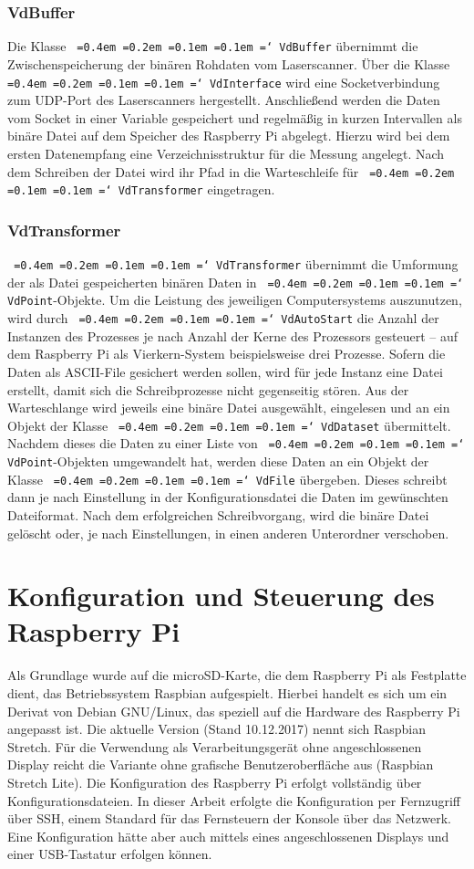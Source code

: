 \documentclass[a4paper,12pt,bibliography=totoc, listof=totoc,titlepage,pointlessnumbers]{scrreprt}
\newcommand*\justify{%
  \fontdimen2\font=0.4em%
  \fontdimen3\font=0.2em%
  \fontdimen4\font=0.1em%
  \fontdimen7\font=0.1em%
  \hyphenchar\font=`\-%
}
\newcommand{\code}[1]{\texttt{\justify{#1}}}
\begin{document}
\subsection{VdBuffer}
Die Klasse \code{VdBuffer} übernimmt die Zwischenspeicherung der binären Rohdaten vom Laser\-scan\-ner. Über die Klasse \code{VdInterface} wird eine Socketverbindung zum UDP-Port des Laser\-scan\-ners hergestellt. Anschließend werden die Daten vom Socket in einer Variable gespeichert und regelmäßig in kurzen Intervallen als binäre Datei auf dem Speicher des Rasp\-berry Pi abgelegt. Hierzu wird bei dem ersten Datenempfang eine Verzeichnisstruktur für die Messung angelegt. Nach dem Schreiben der Datei wird ihr Pfad in die Warteschleife für \code{VdTransformer} eingetragen.

\subsection{VdTransformer}
\code{VdTransformer} übernimmt die Umformung der als Datei gespeicherten binären Daten in \code{VdPoint}-Objekte. Um die Leistung des jeweiligen Computersystems auszunutzen, wird durch \code{VdAutoStart} die Anzahl der Instanzen des Prozesses je nach Anzahl der Kerne des Prozessors gesteuert -- auf dem Rasp\-berry Pi als Vierkern-System beispielsweise drei Prozesse. Sofern die Daten als ASCII-File gesichert werden sollen, wird für jede Instanz eine Datei erstellt, damit sich die Schreibprozesse nicht gegenseitig stören. Aus der Warteschlange wird jeweils eine binäre Datei ausgewählt, eingelesen und an ein Objekt der Klasse \code{VdDataset} übermittelt. Nachdem dieses die Daten zu einer Liste von \code{VdPoint}-Objekten umgewandelt hat, werden diese Daten an ein Objekt der Klasse \code{VdFile} übergeben. Dieses schreibt dann je nach Einstellung in der Konfigurationsdatei die Daten im gewünschten Dateiformat. Nach dem erfolgreichen Schreibvorgang, wird die binäre Datei gelöscht oder, je nach Einstellungen, in einen anderen Unterordner verschoben.

\chapter{Konfiguration und Steuerung des Rasp\-berry Pi}
\label{c:konfig}

Als Grundlage wurde auf die microSD-Karte, die dem Rasp\-berry Pi als Festplatte dient, das Betriebssystem Raspbian aufgespielt. Hierbei handelt es sich um ein Derivat von Debian GNU/Linux, das speziell auf die Hardware des Rasp\-berry Pi angepasst ist. Die aktuelle Version (Stand 10.12.2017) nennt sich Raspbian Stretch. Für die Verwendung als Verarbeitungsgerät ohne angeschlossenen Display reicht die Variante ohne grafische Benutzeroberfläche aus (Raspbian Stretch Lite). Die Konfiguration des Rasp\-berry Pi erfolgt vollständig über Konfigurationsdateien. In dieser Arbeit erfolgte die Konfiguration per Fernzugriff über SSH, einem Standard für das Fernsteuern der Konsole über das Netzwerk. Eine Konfiguration hätte aber auch mittels eines angeschlossenen Displays und einer USB-Tastatur erfolgen können.
\end{document}
